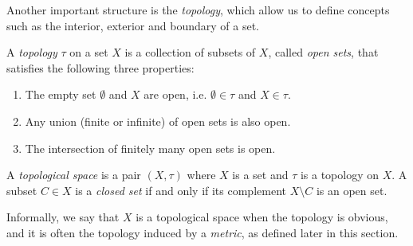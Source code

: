 Another important structure is the \emph{topology}, which allow us to define concepts such as the interior, exterior and boundary of a set.
\begin{definition} 
    A \emph{topology} $\tau$ on a set $X$ is a collection of subsets of $X$, called \emph{open sets}, that satisfies the following three properties:
    \begin{enumerate}
        \item The empty set $\emptyset$ and $X$ are open, i.e. $\emptyset\in\tau$ and $X\in\tau$.
        \item Any union (finite or infinite) of open sets is also open.
        \item The intersection of finitely many open sets is open.
    \end{enumerate}
    A \emph{topological space} is a pair $(X,\tau)$ where $X$ is a set and $\tau$ is a topology on $X$. A subset $C\in X$ is a \emph{closed set} if and only if its complement $X\setminus C$ is an open set. 
\end{definition}

Informally, we say that $X$ is a topological space when the topology is obvious, and it is often the topology induced by a \emph{metric}, as defined later in this section.

